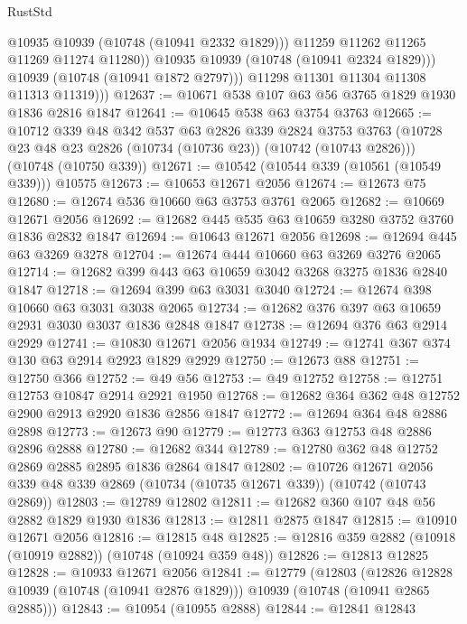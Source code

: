 \begin{lexlean}{RustStd}
\begin{coremodule}
{\begin{coremodule}
{{{{{                    @10935
                    @10939
                    (@10748 (@10941 @2332 @1829)))
                  @11259
                  @11262
                  @11265
                  @11269
                  @11274
                  @11280))
              @10935
              @10939
              (@10748 (@10941 @2324 @1829)))
            @10939
            (@10748 (@10941 @1872 @2797)))
          @11298
          @11301
          @11304
          @11308
          @11313
          @11319)))
@12637 := @10671 @538 @107 @63 @56 @3765 @1829 @1930 @1836 @2816 @1847
@12641 := @10645 @538 @63 @3754 @3763
@12665 := @10712
    @339
    @48
    @342
    @537
    @63
    @2826
    @339
    @2824
    @3753
    @3763
    (@10728 @23 @48 @23 @2826 (@10734 (@10736 @23)) (@10742 (@10743 @2826)))
    (@10748 (@10750 @339))
@12671 := @10542 (@10544 @339 (@10561 (@10549 @339))) @10575
@12673 := @10653 @12671 @2056
@12674 := @12673 @75
@12680 := @12674 @536 @10660 @63 @3753 @3761 @2065
@12682 := @10669 @12671 @2056
@12692 := @12682 @445 @535 @63 @10659 @3280 @3752 @3760 @1836 @2832 @1847
@12694 := @10643 @12671 @2056
@12698 := @12694 @445 @63 @3269 @3278
@12704 := @12674 @444 @10660 @63 @3269 @3276 @2065
@12714 := @12682 @399 @443 @63 @10659 @3042 @3268 @3275 @1836 @2840 @1847
@12718 := @12694 @399 @63 @3031 @3040
@12724 := @12674 @398 @10660 @63 @3031 @3038 @2065
@12734 := @12682 @376 @397 @63 @10659 @2931 @3030 @3037 @1836 @2848 @1847
@12738 := @12694 @376 @63 @2914 @2929
@12741 := @10830 @12671 @2056 @1934
@12749 := @12741 @367 @374 @130 @63 @2914 @2923 @1829 @2929
@12750 := @12673 @88
@12751 := @12750 @366
@12752 := @49 @56
@12753 := @49 @12752
@12758 := @12751 @12753 @10847 @2914 @2921 @1950
@12768 := @12682 @364 @362 @48 @12752 @2900 @2913 @2920 @1836 @2856 @1847
@12772 := @12694 @364 @48 @2886 @2898
@12773 := @12673 @90
@12779 := @12773 @363 @12753 @48 @2886 @2896 @2888
@12780 := @12682 @344
@12789 := @12780 @362 @48 @12752 @2869 @2885 @2895 @1836 @2864 @1847
@12802 := @10726
    @12671
    @2056
    @339
    @48
    @339
    @2869
    (@10734 (@10735 @12671 @339))
    (@10742 (@10743 @2869))
@12803 := @12789 @12802
@12811 := @12682 @360 @107 @48 @56 @2882 @1829 @1930 @1836
@12813 := @12811 @2875 @1847
@12815 := @10910 @12671 @2056
@12816 := @12815 @48
@12825 := @12816 @359 @2882 (@10918 (@10919 @2882)) (@10748 (@10924 @359 @48))
@12826 := @12813 @12825
@12828 := @10933 @12671 @2056
@12841 := @12779
    (@12803
      (@12826 @12828 @10939 (@10748 (@10941 @2876 @1829)))
      @10939
      (@10748 (@10941 @2865 @2885)))
@12843 := @10954 (@10955 @2888)
@12844 := @12841 @12843
}}}}}
\end{coremodule}}
\end{coremodule}
\end{lexlean}
